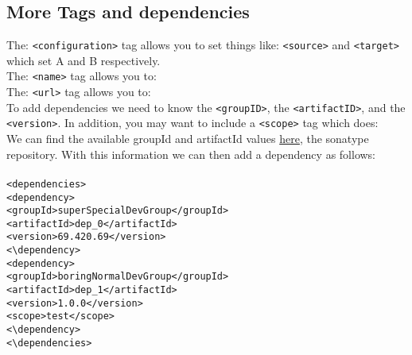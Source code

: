 \documentclass[12pt]{extarticle}
\newcommand\tab[1][1cm]{\hspace*{#1}}
\theoremstyle{plain}
\theoremstyle{Definition}
\theoremstyle{Definition}
\theoremstyle{plain}
\begin{document}
		\subsection{More Tags and dependencies} 
			The: \verb|<configuration>| tag allows you to set things like: \verb|<source>| and \verb|<target>| which set A and B respectively. \\
			The: \verb|<name>| tag allows you to: \\
			The: \verb|<url>| tag allows you to: \\ 
			To add dependencies we need to know the \verb|<groupID>|, the \verb|<artifactID>|, and the \verb|<version>|. In addition, you may want to include a \verb|<scope>| tag which does: \\
			We can find the available groupId and artifactId values \href{https://repository.sonatype.org/#welcome}{here}, the sonatype repository. 
			With this information we can then add a dependency as follows: \\ \\
			\verb|<dependencies>| \\
			\tab \verb|<dependency>| \\
			\tab \tab \verb|<groupId>superSpecialDevGroup</groupId>|
\\
			\tab \tab \verb|<artifactId>dep_0</artifactId>|
\\
			\tab \tab \verb|<version>69.420.69</version>|\\
			\tab \verb|<\dependency>|\\
			\tab \verb|<dependency>|\\
			\tab \tab \verb|<groupId>boringNormalDevGroup</groupId>|
\\
			\tab \tab \verb|<artifactId>dep_1</artifactId>|
\\
			\tab \tab \verb|<version>1.0.0</version>| \\
			\tab \tab \verb|<scope>test</scope>| \\			
			\tab \verb|<\dependency>| \\
			\verb|<\dependencies>| \\

			
\end{document}
